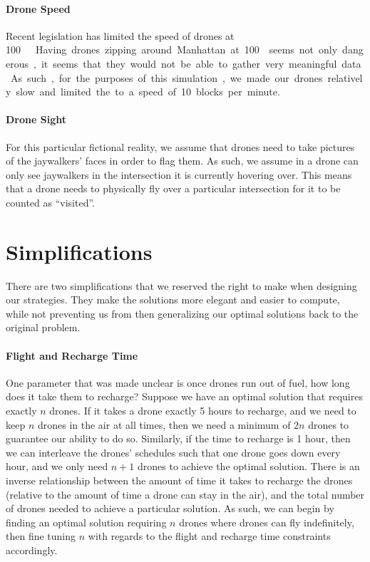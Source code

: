 \documentclass{article}
\begin{document}
\paragraph{Drone Speed}
\label{par:drone_speed}
Recent legislation has limited the speed of drones at \SI{100}\mph \cite{dronespeed}. Having drones zipping around Manhattan at \SI{100}\mph seems not only dangerous, it seems that they would not be able to gather very meaningful data. As such, for the purposes of this simulation, we made our drones relatively slow and limited the to a speed of 10 blocks per minute.

\paragraph{Drone Sight}
\label{par:drone_sight}
For this particular fictional reality, we assume that drones need to take pictures of the jaywalkers' faces in order to flag them. As such, we assume in a drone can only see jaywalkers in the intersection it is currently hovering over. This means that a drone needs to physically fly over a particular intersection for it to be counted as ``visited''.

\section{Simplifications}
There are two simplifications that we reserved the right to make when designing our strategies. They make the solutions more elegant and easier to compute, while not preventing us from then generalizing our optimal solutions back to the original problem.
\paragraph{Flight and Recharge Time}
\label{par:flight_and_recharge_time}
One parameter that was made unclear is once drones run out of fuel, how long does it take them to recharge? Suppose we have an optimal solution that requires exactly $n$ drones. If it takes a drone exactly 5 hours to recharge, and we need to keep $n$ drones in the air at all times, then we need a minimum of $2n$ drones to guarantee our ability to do so. Similarly, if the time to recharge is 1 hour, then we can interleave the drones' schedules such that one drone goes down every hour, and we only need $n+1$ drones to achieve the optimal solution. There is an inverse relationship between the amount of time it takes to recharge the drones (relative to the amount of time a drone can stay in the air), and the total number of drones needed to achieve a particular solution. As such, we can begin by finding an optimal solution requiring $n$ drones where drones can fly indefinitely, then fine tuning $n$ with regards to the flight and recharge time constraints accordingly.
\end{document}
